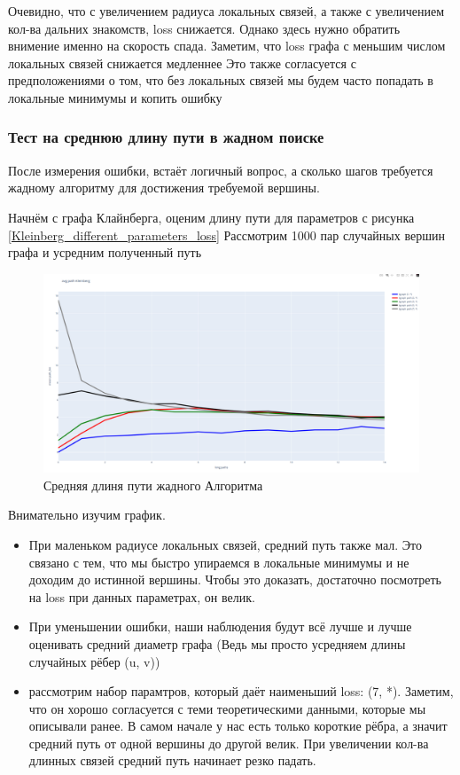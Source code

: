 Очевидно, что с увеличением радиуса локальных связей, а также с увеличением кол-ва 
дальних знакомств, loss снижается. Однако здесь нужно обратить внимение именно на скорость
спада. Заметим, что loss графа с меньшим числом локальных связей снижается медленнее
Это также согласуется с предположениями о том, что без локальных связей мы будем часто
попадать в локальные минимумы и копить ошибку

\subsubsection{Тест на среднюю длину пути в жадном поиске}

После измерения ошибки, встаёт логичный вопрос, а сколько шагов требуется жадному алгоритму для
достижения требуемой вершины. 

Начнём с графа Клайнберга, оценим длину пути для параметров с рисунка \ref{Kleinberg_different_parameters_loss}
Рассмотрим 1000 пар случайных вершин графа и усредним полученный путь

\begin{figure}[H]
    \centering
    \includegraphics[scale=0.25]{./pictures/Kleinberg_mean_path_len.png}
    \caption{Средняя длиня пути жадного Алгоритма} \label{Kleinberg_different_parameters_path}
\end{figure}

Внимательно изучим график. 
\begin{itemize}
    \item При маленьком радиусе локальных связей, средний путь также мал. Это связано с тем,
что мы быстро упираемся в локальные минимумы и не доходим до истинной вершины. Чтобы это доказать,
достаточно посмотреть на loss при данных параметрах, он велик.

    \item При уменьшении ошибки, наши наблюдения будут всё лучше и лучше оценивать средний диаметр графа
    (Ведь мы просто усредняем длины случайных рёбер (u, v))

    \item рассмотрим набор парамтров, который даёт наименьший loss: (7, *). Заметим, что 
    он хорошо согласуется с теми теоретическими данными, которые мы описывали ранее. В самом начале у нас есть только 
    короткие рёбра, а значит средний путь от одной вершины до другой велик. При увеличении кол-ва длинных связей 
    средний путь начинает резко падать.
    
\end{itemize}